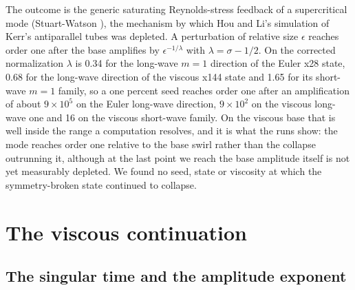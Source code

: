 \documentclass[11pt]{article}
\newcommand{\sn}[2]{#1\times 10^{#2}}
\begin{document}
The outcome is the generic saturating Reynolds-stress feedback of a supercritical mode (Stuart-Watson \cite{SW60}), the mechanism by which Hou and Li's simulation of Kerr's antiparallel tubes \cite{HL06,HL08} was depleted. A perturbation of relative size $\epsilon$ reaches order one after the base amplifies by $\epsilon^{-1/\lambda}$ with $\lambda = \sigma - 1/2$. On the corrected normalization $\lambda$ is 0.34 for the long-wave $m = 1$ direction of the Euler x28 state, 0.68 for the long-wave direction of the viscous x144 state and 1.65 for its short-wave $m = 1$ family, so a one percent seed reaches order one after an amplification of about $\sn{9}{5}$ on the Euler long-wave direction, $\sn{9}{2}$ on the viscous long-wave one and 16 on the viscous short-wave family. On the viscous base that is well inside the range a computation resolves, and it is what the runs show: the mode reaches order one relative to the base swirl rather than the collapse outrunning it, although at the last point we reach the base amplitude itself is not yet measurably depleted. We found no seed, state or viscosity at which the symmetry-broken state continued to collapse.

\section{The viscous continuation}

\subsection{The singular time and the amplitude exponent}
\end{document}
